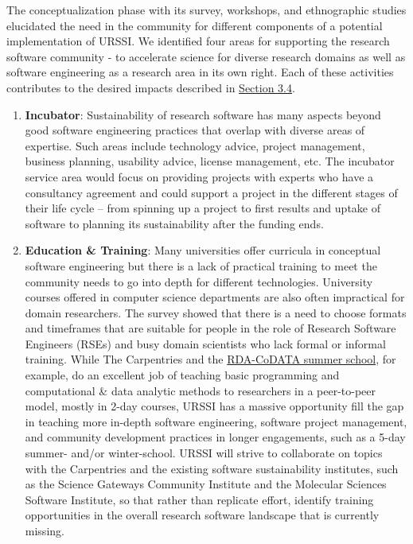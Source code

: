 \documentclass[
]{book}
\begin{document}
The conceptualization phase with its survey, workshops, and ethnographic studies elucidated the need in the community for different components of a potential implementation of URSSI. We identified four areas for supporting the research software community - to accelerate science for diverse research domains as well as software engineering as a research area in its own right. Each of these activities contributes to the desired impacts described in \href{https://plan.urssi.us/chapter3.html\#desired-impact}{Section 3.4}.

\begin{enumerate}
\def\labelenumi{\arabic{enumi}.}
\item
  \textbf{Incubator}: Sustainability of research software has many aspects beyond good software engineering practices that overlap with diverse areas of expertise. Such areas include technology advice, project management, business planning, usability advice, license management, etc. The incubator service area would focus on providing projects with experts who have a consultancy agreement and could support a project in the different stages of their life cycle -- from spinning up a project to first results and uptake of software to planning its sustainability after the funding ends.
\item
  \textbf{Education \& Training}: Many universities offer curricula in conceptual software engineering but there is a lack of practical training to meet the community needs to go into depth for different technologies. University courses offered in computer science departments are also often impractical for domain researchers. The survey showed that there is a need to choose formats and timeframes that are suitable for people in the role of Research Software Engineers (RSEs) and busy domain scientists who lack formal or informal training. While The Carpentries and the \href{https://codata.org/initiatives/strategic-programme/research-data-science-summer-schools/}{RDA-CoDATA summer school}, for example, do an excellent job of teaching basic programming and computational \& data analytic methods to researchers in a peer-to-peer model, mostly in 2-day courses, URSSI has a massive opportunity fill the gap in teaching more in-depth software engineering, software project management, and community development practices in longer engagements, such as a 5-day summer- and/or winter-school. URSSI will strive to collaborate on topics with the Carpentries and the existing software sustainability institutes, such as the Science Gateways Community Institute and the Molecular Sciences Software Institute, so that rather than replicate effort, identify training opportunities in the overall research software landscape that is currently missing.

\end{enumerate}
\end{document}
